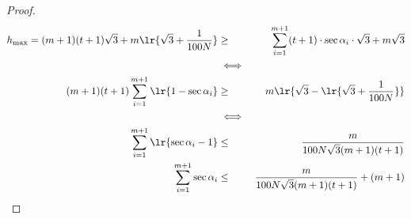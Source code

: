 \begin{proof}
\begin{eqnarray*}
h_\text{max} = (m+1) (t+1) \sqrt{3} + m \lr{\sqrt{3} + \frac{1}{100N}}&\geq& \sum_{i = 1}^{m+1} (t+1) \cdot \sec \alpha_i \cdot \sqrt{3} + m \sqrt{3}\\
&\iff&\\
(m+1) (t+1) \sum_{i = 1}^{m+1} \lr{1 - \sec \alpha_i}&\geq& m \lr{\sqrt{3} - \lr{\sqrt{3}+ \frac{1}{100N}}}\\
&\iff&\\
\sum_{i = 1}^{m+1} \lr{ \sec \alpha_i - 1} &\leq& \frac{m}{100 N \sqrt{3} (m+1)(t+1) }\\
\sum_{i = 1}^{m+1}  \sec \alpha_i &\leq& \frac{m}{100 N \sqrt{3} (m+1)(t+1) } + (m+1)
\end{eqnarray*}




\end{proof}

